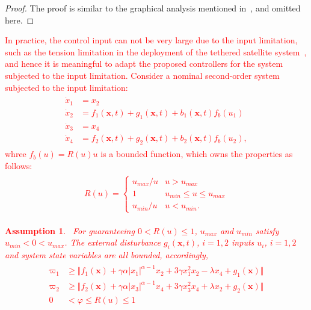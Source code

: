 \documentclass[3p]{elsarticle}
\theoremstyle{plain}
\newtheorem{myas}{Assumption}
\theoremstyle{remark}
\begin{document}
\begin{proof}
The proof is similar to the graphical analysis mentioned in~\cite{feng2013nonsingular}, and omitted here.
\end{proof}
\textcolor{red}{
In practice, the control input can not be very large due to the input limitation, such as the tension limitation in the deployment of the tethered satellite system~\cite{Ma201667}, and hence it is meaningful to adapt the proposed controllers for the system subjected to the input limitation. Consider a nominal second-order system subjected to the input limitation:
\begin{align}
\begin{split}
\dot x_1 &= x_2\\
\dot x_2 &= f_1(\bm x,t)+g_1(\bm x,t)+b_1(\bm x,t)f_b(u_1)\\
\dot x_3 &= x_4\\
\dot x_4 &= f_2(\bm x,t)+g_2(\bm x,t)+b_2(\bm x,t)f_b(u_2),\label{eq:second-order system subjected to limitation}
\end{split}
\end{align}
whree $f_b(u) = R(u)u$ is a bounded function, which owns the properties as follows:
\begin{align}\begin{split}
  R(u)=\begin{cases}
  u_{max}/u &u>u_{max}\\
  1&u_{min}\le u\le u_{max}\\
  u_{min}/u& u<u_{min}.
\end{cases}\end{split}
\end{align}
\begin{myas}~\cite{Ma201667}\label{myas:1}
For guaranteeing $0<R(u)\le 1$, $u_{max}$ and $u_{min}$ satisfy $u_{min}<0<u_{max}$. The external disturbance $g_i(\bm x,t)$, $i=1,2$ inputs $u_i$, $i=1,2$ and system state variables are all bounded, accordingly,
\begin{align}\begin{split}
  \varpi_1 &\ge \Vert f_1(\bm x)+\gamma\alpha\vert x_1\vert^{\alpha-1}x_2+3\gamma x_1^2x_2-\lambda x_4+g_1(\bm x)\Vert\\
  \varpi_2 &\ge \Vert f_2(\bm x)+\gamma\alpha\vert x_3\vert^{\alpha-1}x_4+3\gamma x_3^2x_4+\lambda x_2+g_2(\bm x)\Vert\\
  0&<\varphi\le R(u) \le 1
\end{split}\end{align}
\end{myas}
}
\end{document}
